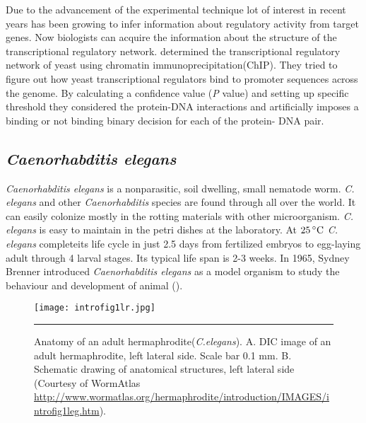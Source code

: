 Due to the advancement of the experimental technique lot of interest in recent years has been growing to infer information about regulatory activity from target genes. Now biologists can acquire the information about the structure of the transcriptional regulatory network. \cite{Lee:2002} determined the transcriptional regulatory network of yeast using chromatin immunoprecipitation(ChIP). They tried to figure out how yeast transcriptional regulators bind to promoter sequences across the genome. By calculating a confidence value (\textit{P} value) and setting up specific threshold they considered the protein-DNA interactions and artificially imposes a binding or not binding binary decision for each of the protein- DNA pair.

\subsection{\textit{Caenorhabditis elegans}}
\textit{Caenorhabditis elegans} is a nonparasitic, soil dwelling, small nematode worm. \textit{C. elegans} and other \textit{Caenorhabditis} species are found through all over the world. It can easily colonize mostly in the rotting materials with other microorganism. \textit{C. elegans} is easy to maintain in the petri dishes at the laboratory. At $25\,^{\circ}{\rm C}$ \textit{C. elegans} completeits life cycle in just 2.5 days from fertilized embryos to egg-laying adult through 4 larval stages. Its typical life span is 2-3 weeks. In 1965, Sydney Brenner introduced \textit{Caenorhabditis elegans} as a model organism to study the behaviour and development of animal (\cite{Brenner:1974}).

\begin{figure}%
	\centering
		\texttt{[image: introfig1lr.jpg]}
		\rule{35em}{0.5pt}
	\caption[Anatomy of an adult \textit{C.elegans}]{Anatomy of an adult hermaphrodite(\textit{C.elegans}). 
	A. DIC image of an adult hermaphrodite, left lateral side. Scale bar 0.1 mm. 
	B. Schematic drawing of anatomical structures, left lateral side 
	(Courtesy of WormAtlas \url{http://www.wormatlas.org/hermaphrodite/introduction/IMAGES/introfig1leg.htm}).}
	\label{fig:anatomy}
\end{figure}

